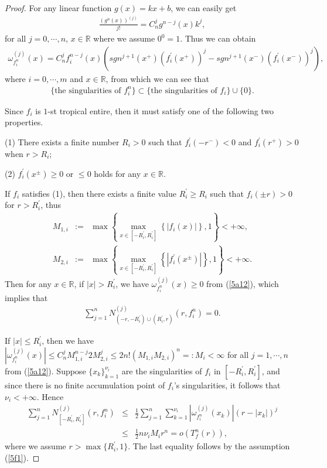 \documentclass{article}
\begin{document}
\begin{proof}
    For any linear function $g(x)=kx+b$, we can easily get 
    \begin{eqnarray*}
        \frac{(g^{n}(x))^{(j)}}{j!}=C_{n}^{j}g^{n-j}(x)k^{j},
    \end{eqnarray*}
    for all $j=0, \cdots, n$, $x\in\mathbb{R}$ where we assume $0^{0}=1$. Thus we can obtain
    \begin{eqnarray}\label{5a12}
        \omega_{f_{i}^{n}}^{(j)}(x)=C_{n}^{j}f_{i}^{n-j}(x)\left(sgn^{j+1}(x^{+})(f_{i}^{'}(x^{+}))^{j}-sgn^{j+1}(x^{-})(f_{i}^{'}(x^{-}))^{j}\right),
    \end{eqnarray}
    where $i=0, \cdots, m$ and $x\in\mathbb{R}$, from which we can see that
    \begin{eqnarray*}
        \{\text{the singularities of } f_{i}^{n}\}\subset\{\text{the singularities of } f_{i}\}\cup \{0\}.
    \end{eqnarray*}

    Since $f_{i}$ is $1$-st tropical entire, then it must satisfy one of the following two properties.

    (1) There exists a finite number $R_{i}>0$ such that $f_{i}^{'}(-r^{-})<0$ and $f_{i}^{'}(r^{+})>0$ when $r>R_{i}$;

    (2) $f_{i}^{'}(x^{\pm})\geq 0$ or $\leq 0$ holds for any $x\in\mathbb{R}$.

    If $f_{i}$ satisfies (1), then there exists a finite value $R_{i}^{'}\geq R_{i}$ such that $f_{i}(\pm r)>0$ for $r>R_{i}^{'}$, thus
    \begin{eqnarray*}
        M_{1, i}&:=&\max\left\{\max\limits_{x\in[-R_{i}^{'}, R_{i}^{'}]}\left\{|f_{i}(x)|\right\}, 1\right\}<+\infty,\\
        M_{2, i}&:=&\max\left\{\max\limits_{x\in[-R_{i}^{'}, R_{i}^{'}]}\left\{|f_{i}^{'}(x^{\pm})|\right\}, 1\right\}<+\infty.
    \end{eqnarray*}
    Then for any $x\in \mathbb{R}$, if $|x|> R_{i}^{'}$, we have $\omega_{f_{i}^{n}}^{(j)}(x)\geq 0$ from (\ref{5a12}), which implies that 
    \begin{eqnarray}\label{5a13}
      \sum_{j=1}^{n}N_{(-r, -R_{i}^{'})\cup (R_{i}^{'}, r)}^{(j)}(r, f_{i}^{n})=0.
    \end{eqnarray}
    
    If $|x|\leq R_{i}^{'}$, then we have $|\omega_{f_{i}^{n}}^{(j)}(x)|\leq C_{n}^{j}M_{1, i}^{n-j}2M_{2, i}^{j}\leq 2n!(M_{1, i}M_{2, i})^{n}=:M_{i}<\infty$ for all $j=1, \cdots, n$ from (\ref{5a12}). Suppose $\{x_{k}\}_{k=1}^{\nu_{i}}$ are the singularities of $f_{i}$ in $[-R_{i}^{'}, R_{i}^{'}]$, and since there is no finite accumulation point of $f_{i}$'s singularities, it follows that $\nu_{i}<+\infty$. Hence
    \begin{eqnarray}\label{5a14}
        \sum_{j=1}^{n}N_{[-R_{i}^{'}, R_{i}^{'}]}^{(j)}(r, f_{i}^{n})&\leq& \frac{1}{2}\sum_{j=1}^{n}\sum_{k=1}^{\nu_{i}}|\omega_{f_{i}^{n}}^{(j)}(x_{k})|(r-|x_{k}|)^{j}\nonumber\\
        &\leq& \frac{1}{2}n\nu_{i}M_{i}r^{n}=o(T_{f}^{n}(r)),
    \end{eqnarray}
    where we assume $r>\max\{R_{i}^{'}, 1\}$. The last equality follows by the assumption (\ref{5f1}).
    

\end{proof}
\end{document}
